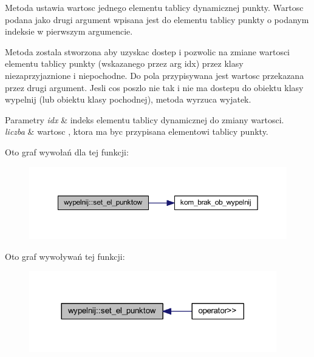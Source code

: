 Metoda ustawia wartosc jednego elementu tablicy dynamicznej punkty. Wartosc podana jako drugi argument wpisana jest do elementu tablicy punkty o podanym indeksie w pierwszym argumencie.

Metoda zostala stworzona aby uzyskac dostep i pozwolic na zmiane wartosci elementu tablicy punkty (wskazanego przez arg idx) przez klasy niezaprzyjaznione i niepochodne. Do pola przypisywana jest wartosc przekazana przez drugi argument. Jesli cos poszlo nie tak i nie ma dostepu do obiektu klasy wypelnij (lub obiektu klasy pochodnej), metoda wyrzuca wyjatek. 
\begin{DoxyParams}{Parametry}
{\em idx} & indeks elementu tablicy dynamicznej do zmiany wartosci. \\
\hline
{\em liczba} & wartosc , ktora ma byc przypisana elementowi tablicy punkty. \\
\hline
\end{DoxyParams}
Oto graf wywołań dla tej funkcji\+:
\nopagebreak
\begin{figure}[H]
\begin{center}
\leavevmode
\includegraphics[width=350pt]{classwypelnij_a8da39f8d32230b2db5f87d0e4cebc83f_cgraph}
\end{center}
\end{figure}
Oto graf wywoływań tej funkcji\+:
\nopagebreak
\begin{figure}[H]
\begin{center}
\leavevmode
\includegraphics[width=305pt]{classwypelnij_a8da39f8d32230b2db5f87d0e4cebc83f_icgraph}
\end{center}
\end{figure}
\mbox{\label{classwypelnij_a7127a46567e8f6defc6475c96a651c47}} 
